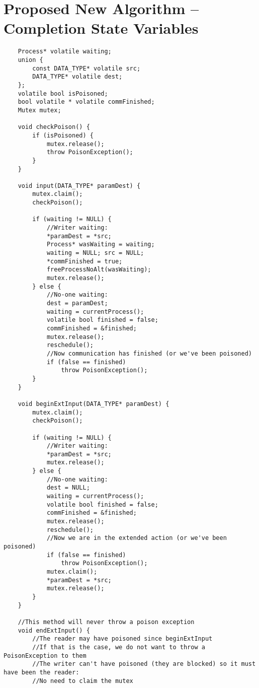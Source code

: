 \documentclass{article}
\begin{document}
\section{Proposed New Algorithm -- Completion State Variables}


{\small\begin{verbatim}
    Process* volatile waiting;
    union {
        const DATA_TYPE* volatile src;
        DATA_TYPE* volatile dest;
    };
    volatile bool isPoisoned;
    bool volatile * volatile commFinished;
    Mutex mutex;

    void checkPoison() {
        if (isPoisoned) {
            mutex.release();
            throw PoisonException();
        }
    }

    void input(DATA_TYPE* paramDest) {
        mutex.claim();
        checkPoison();        

        if (waiting != NULL) {
            //Writer waiting:
            *paramDest = *src;
            Process* wasWaiting = waiting;
            waiting = NULL; src = NULL;
            *commFinished = true;
            freeProcessNoAlt(wasWaiting);
            mutex.release();
        } else {
            //No-one waiting:
            dest = paramDest;
            waiting = currentProcess();
            volatile bool finished = false;
            commFinished = &finished;
            mutex.release();
            reschedule();
            //Now communication has finished (or we've been poisoned)
            if (false == finished)
                throw PoisonException();
        }
    }

    void beginExtInput(DATA_TYPE* paramDest) {
        mutex.claim();
        checkPoison();

        if (waiting != NULL) {
            //Writer waiting:
            *paramDest = *src;
            mutex.release();
        } else {
            //No-one waiting:
            dest = NULL;
            waiting = currentProcess();
            volatile bool finished = false;
            commFinished = &finished;
            mutex.release();
            reschedule();
            //Now we are in the extended action (or we've been poisoned)
            if (false == finished)
                throw PoisonException();
            mutex.claim();
            *paramDest = *src;
            mutex.release();
        }
    }

    //This method will never throw a poison exception
    void endExtInput() {
        //The reader may have poisoned since beginExtInput
        //If that is the case, we do not want to throw a PoisonException to them
        //The writer can't have poisoned (they are blocked) so it must have been the reader:
        //No need to claim the mutex


\end{verbatim}}
\end{document}
